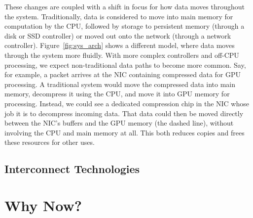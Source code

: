 {    These changes are coupled with a shift in focus for how data moves throughout the system.
    Traditionally, data is considered to move into main memory for computation by the CPU, followed by
    storage to persistent memory (through a disk or SSD controller) or moved out onto the network
    (through a network controller). Figure~\ref{fig:sys_arch} shows a different model, where data moves
    through the system more fluidly. With more complex controllers and off-CPU processing, we expect
    non-traditional data paths to become more common. Say, for example, a packet arrives at the NIC
    containing compressed data for GPU processing. A traditional system would move the compressed data
    into main memory, decompress it using the CPU, and move it into GPU memory for processing. Instead,
    we could see a dedicated compression chip in the NIC whose job it is to decompress incoming data.
    That data could then be moved directly between the NIC's buffers and the GPU memory (the dashed
    line), without involving the CPU and main memory at all. This both reduces copies and frees these
    resources for other uses.
}


\subsection{Interconnect Technologies}

\section{Why Now?}

